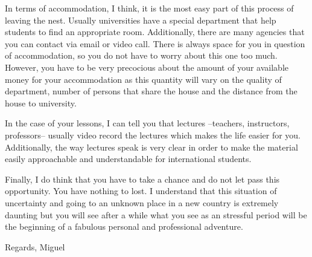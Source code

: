 \documentclass[10pt]{article}
\begin{document}
In terms of accommodation, I think, it is the most easy part of this process
of leaving the nest. Usually universities have a special department that help 
students to find an appropriate room. Additionally, there are many agencies 
that you can contact via email or video call. 
There is always space for you in question of accommodation, 
so you do not have to worry about this one too much.
However, you have to be very precocious about the amount of your available money
for your accommodation as this quantity will vary on the quality of department, 
number of persons that share the house and the distance from the house to 
university.

In the case of your lessons, I can tell you that lectures --teachers, instructors, professors-- 
usually video record the lectures which makes the life easier for you. Additionally, 
the way lectures speak is very clear in order to make the material easily approachable 
and understandable for international students.

Finally, I do think that you have to take a chance and do not let pass this opportunity.
You have nothing to lost. I understand that this situation of uncertainty and going to 
an unknown place in a new country is extremely daunting but you will see after a while
what you see as an stressful period will be the beginning of a fabulous personal and professional
adventure.

Regards,
Miguel
\end{document}
